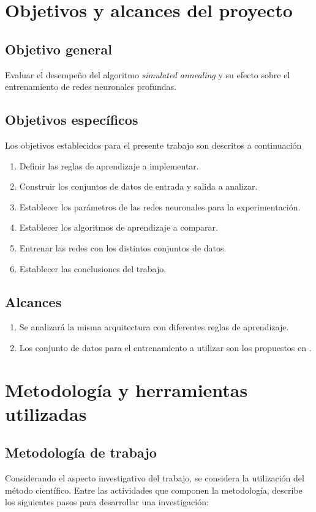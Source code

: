 \section{Objetivos y alcances del proyecto}
\subsection{Objetivo general}
Evaluar el desempeño del algoritmo {\em simulated annealing} y su efecto sobre el entrenamiento de redes neuronales profundas.

\subsection{Objetivos específicos}
Los objetivos establecidos para el presente trabajo son descritos a continuación
\begin{enumerate}
	\item Definir las reglas de aprendizaje a implementar.
	\item Construir los conjuntos de datos de entrada y salida a analizar.
	\item Establecer los parámetros de las redes neuronales para la experimentación.
	\item Establecer los algoritmos de aprendizaje a comparar.
	\item Entrenar las redes con los distintos conjuntos de datos.
	\item Establecer las conclusiones del trabajo.
\end{enumerate}

\subsection{Alcances}
\begin{enumerate}
	\item Se analizará la misma arquitectura con diferentes reglas de aprendizaje.
	\item Los conjunto de datos para el entrenamiento a utilizar son los propuestos en \cite{Morse2016}.
\end{enumerate}

\section{Metodología y herramientas utilizadas}
\subsection{Metodología de trabajo}
Considerando el aspecto investigativo del trabajo, se considera la utilización del método científico. Entre las actividades que componen la metodología,  describe los siguientes pasos para desarrollar una investigación:

